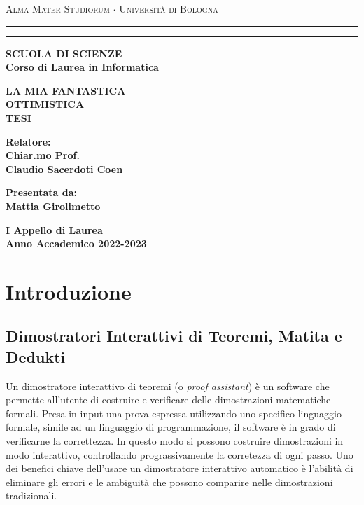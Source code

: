 \documentclass[12pt,a4paper]{report}
\begin{document}
\begin{titlepage}
  \begin{center}
    {{
      \Large{\textsc{Alma Mater Studiorum $\cdot$ Universit\`a di Bologna}}
    }} \rule[0.1cm]{15.8cm}{0.1mm}
    \rule[0.5cm]{15.8cm}{0.6mm}
    {\small{\bf SCUOLA DI SCIENZE\\
    Corso di Laurea in Informatica}}
  \end{center}
  \vspace{15mm}
  \begin{center}
    {\LARGE{\bf LA MIA FANTASTICA}}\\
    \vspace{3mm}
    {\LARGE{\bf OTTIMISTICA}}\\
    \vspace{3mm}
    {\LARGE{\bf TESI}}\\
  \end{center}
  \vspace{40mm}
  \par
  \noindent
  \begin{minipage}[t]{0.47\textwidth}
  {\large{\bf Relatore:\\
  Chiar.mo Prof.\\
  Claudio Sacerdoti Coen}}
  \end{minipage}
  \hfill
  \begin{minipage}[t]{0.47\textwidth}\raggedleft
  {\large{\bf Presentata da:\\
  Mattia Girolimetto}}
  \end{minipage}
  \vspace{20mm}
  \begin{center}
  {\large{\bf I Appello di Laurea\\%
  Anno Accademico 2022-2023}}%
  \end{center}
\end{titlepage}


\tableofcontents

\chapter{Introduzione}
\section{Dimostratori Interattivi di Teoremi, Matita e Dedukti}
Un dimostratore interattivo di teoremi (o \textit{proof assistant}) è un software 
che permette all'utente di costruire e verificare delle dimostrazioni matematiche formali.
Presa in input una prova espressa utilizzando uno specifico linguaggio 
formale, simile ad un linguaggio di programmazione, il software è in grado di verificarne
la correttezza.
In questo modo si possono costruire dimostrazioni in modo interattivo, controllando prograssivamente
la corretezza di ogni passo.
Uno dei benefici chiave dell'usare un dimostratore interattivo automatico è l'abilità di 
eliminare gli errori e le ambiguità che possono comparire nelle dimostrazioni tradizionali.
\end{document}
